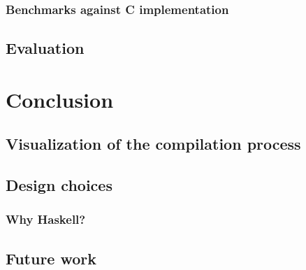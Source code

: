 \documentclass[a4paper, twoside]{report}
\begin{document}
\subsection{Benchmarks against C implementation}
\section{Evaluation}

\chapter{Conclusion}
\section{Visualization of the compilation process}
\section{Design choices}
\subsection{Why Haskell?}
\section{Future work}
% 
% 



\end{document}
